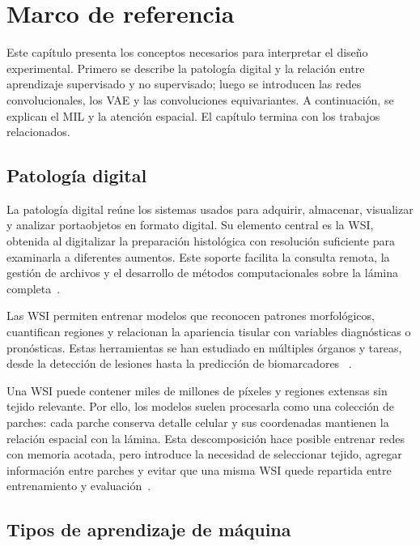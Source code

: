 \chapter{Marco de referencia}

Este capítulo presenta los conceptos necesarios para interpretar el diseño
experimental. Primero se describe la patología digital y la relación entre
aprendizaje supervisado y no supervisado; luego se introducen las redes
convolucionales, los VAE y las convoluciones equivariantes. A continuación, se
explican el MIL y la atención espacial. El
capítulo termina con los trabajos relacionados.

\section{Patología digital}

La patología digital reúne los sistemas usados para adquirir, almacenar,
visualizar y analizar portaobjetos en formato digital. Su elemento central es
la WSI, obtenida
al digitalizar la preparación histológica con resolución suficiente para
examinarla a diferentes aumentos. Este soporte facilita la consulta remota, la
gestión de archivos y el desarrollo de métodos computacionales sobre la lámina
completa~\cite{pallua_future_2020,song_artificial_2023,baxi_digital_2022}.

Las WSI permiten entrenar modelos que reconocen patrones morfológicos,
cuantifican regiones y relacionan la apariencia tisular con variables
diagnósticas o pronósticas. Estas herramientas se han estudiado en múltiples
órganos y tareas, desde la detección de lesiones hasta la predicción de
biomarcadores
~\cite{niazi_digital_2019,song_artificial_2023,verghese_computational_2023}.

Una WSI puede contener miles de millones de píxeles y regiones extensas sin
tejido relevante. Por ello, los modelos suelen procesarla como una colección
de parches: cada parche conserva detalle celular y sus coordenadas mantienen
la relación espacial con la lámina. Esta descomposición hace posible entrenar
redes con memoria acotada, pero introduce la necesidad de seleccionar tejido,
agregar información entre parches y evitar que una misma WSI quede repartida
entre entrenamiento y evaluación~\cite{wang_managing_2012,niazi_digital_2019}.

\section{Tipos de aprendizaje de máquina}

